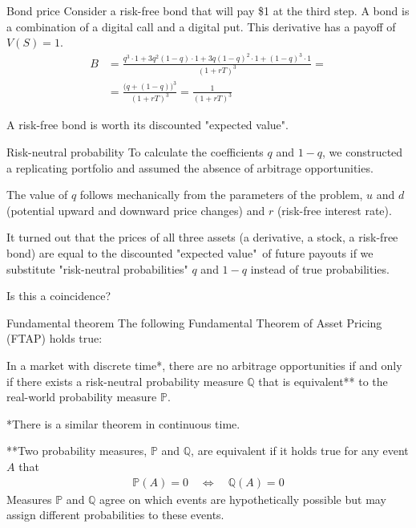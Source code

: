 \documentclass{beamer}
\begin{document}
\begin{frame}{Bond price}
\justify
Consider a risk-free bond that will pay \$1 at the third step. A bond is a combination of a digital call and a digital put. This derivative has a payoff of $V(S) = 1$.
\begin{align*}
B &= \frac{q^3 \cdot 1 + 3q^2(1-q) \cdot 1 + 3q(1-q)^2 \cdot 1 + (1-q)^3 \cdot 1}{(1+rT)^3} = \\
&= \frac{\Big(q + (1-q) \Big)^3}{(1+rT)^3} = \frac{1}{(1+rT)^3}
\end{align*}

\justify
A risk-free bond is worth its discounted "expected value".
\end{frame}



\begin{frame}{Risk-neutral probability}
\justify
To calculate the coefficients $q$ and $1-q$, we constructed a replicating portfolio and assumed the absence of arbitrage opportunities.

\justify
The value of $q$ follows mechanically from the parameters of the problem, $u$ and $d$ (potential upward and downward price changes) and $r$ (risk-free interest rate).

\justify
It turned out that the prices of all three assets (a derivative, a stock, a risk-free bond) are equal to the discounted "expected value"\ of future payouts if we substitute "risk-neutral probabilities" $q$ and $1-q$ instead of true probabilities.

\justify
Is this a coincidence?
\end{frame}



\begin{frame}{Fundamental theorem}
\justify
The following \alert{Fundamental Theorem of Asset Pricing (FTAP)} holds true:

\justify
In a market with discrete time*, there are no arbitrage opportunities if and only if there exists a risk-neutral probability measure $\mathbb{Q}$ that is equivalent** to the real-world probability measure $\mathbb{P}$.

\justify
*There is a similar theorem in continuous time.

\justify
**Two probability measures, $\mathbb{P}$ and $\mathbb{Q}$, are equivalent if it holds true for any event $A$ that 
\begin{align*}
\mathbb{P}(A)=0 \quad \Leftrightarrow \quad \mathbb{Q}(A)=0
\end{align*}
Measures $\mathbb{P}$ and $\mathbb{Q}$ agree on which events are hypothetically possible but may assign different probabilities to these events.
\end{frame}
\end{document}
